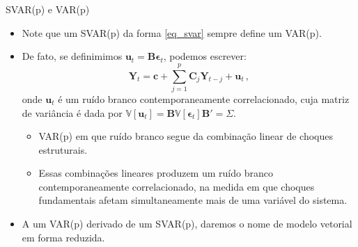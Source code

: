 \documentclass[11pt]{beamer}
\begin{document}
\begin{frame}{SVAR(p) e VAR(p)}
\begin{itemize}
	\item Note que um SVAR(p) da forma \eqref{eq_svar} sempre define um VAR(p).
	\item De fato, se definimimos $\boldsymbol{u}_t = \boldsymbol{B}\boldsymbol{\epsilon}_t$,  podemos escrever:
	\begin{equation}
		\label{eq_rvar}
		\boldsymbol{Y}_t = \boldsymbol{c}+ \sum_{j=1}^p \boldsymbol{C}_j \boldsymbol{Y}_{t-j} + \boldsymbol{u}_t\, ,
	\end{equation}
	onde $\boldsymbol{u}_t$ é um {\color{blue}ruído branco contemporaneamente correlacionado}, cuja matriz de variância é dada por $\mathbb{V}[\boldsymbol{u}_t] = \boldsymbol{B}\mathbb{V}[\boldsymbol{\epsilon}_t] \boldsymbol{B}' =\Sigma$.
	\begin{itemize}
		\item VAR(p) em que ruído branco segue da combinação linear de choques estruturais.
		\item Essas combinações lineares produzem um ruído branco contemporaneamente correlacionado, na medida em que choques fundamentais afetam simultaneamente mais de uma variável do sistema.
	\end{itemize}
	\item A um VAR(p) derivado de um SVAR(p), daremos o nome de {\color{blue}modelo vetorial em forma reduzida}.
\end{itemize}
\end{frame}
\end{document}
